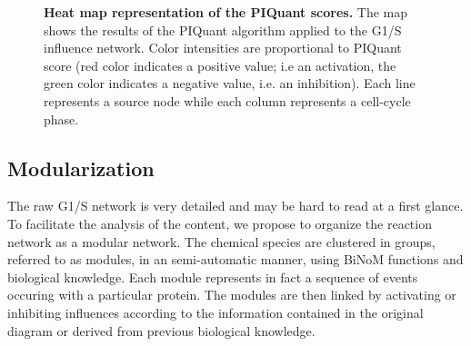 \documentclass[10pt]{bmc_article}
\newenvironment{bmcformat}{\baselineskip20pt\sloppy\setboolean{publ}{false}}{\baselineskip20pt\sloppy}
\begin{document}
\begin{bmcformat}
\begin{figure}[h]
  \caption{\label{PIQuantHeatMap} \textbf{Heat map representation of the PIQuant
scores.}
    The map shows the results of the PIQuant algorithm applied to the G1/S
influence network. Color intensities are proportional to PIQuant score (red color indicates a positive
value; i.e an activation, the green color indicates a negative value, i.e. an
inhibition).
Each line represents a source node while each column represents a cell-cycle
phase.}

\end{figure}



\subsection*{Modularization}

The raw G1/S network is very detailed and may be hard to read at a first glance.
To facilitate the analysis of the content, we propose to organize the reaction
network as a modular network. The chemical species are clustered in groups, referred to
as modules, in an semi-automatic manner, using BiNoM functions and biological
knowledge. Each module represents in fact a
sequence of events occuring with a particular protein. The modules are then
linked by activating or inhibiting influences according to the information
contained in the original diagram or derived from previous biological knowledge.


\end{bmcformat}
\end{document}
